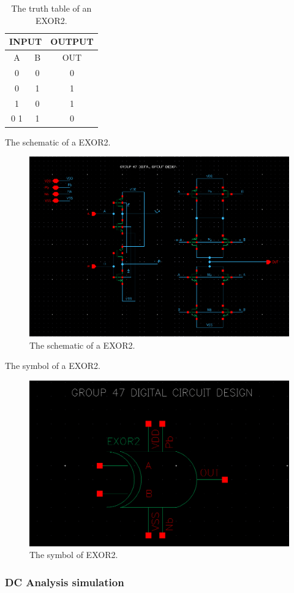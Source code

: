 \begin{table}[H]
	\centering
	\begin{tabular}{|c|c|c|}
		\hline
		\multicolumn{2}{|c|}{INPUT} & OUTPUT \\
		\hline
		A & B  & OUT\\
		\hline
		0 & 0 & 0 \\
		\hline
		0 & 1 & 1\\
		\hline
		1 & 0 & 1\\
		\hline0
		1 & 1 & 0\\
		\hline
	\end{tabular}
	\caption{The truth table of an EXOR2.}
	\label{t_the truth table of EXOR2}
\end{table}

The schematic of a EXOR2.

\begin{figure}[H]
	\centering
	\includegraphics[width=.6\linewidth]{section/EX1/EXOR/EX1_EXOR2_schematic.png}
	\caption{The schematic of a EXOR2.}
	\label{f_EX1_EXOR2_schematic}
\end{figure} 

The symbol of a EXOR2.

\begin{figure}[H]
	\centering
	\includegraphics[width=.6\linewidth]{section/EX1/EXOR/EX1_EXOR2_symbol.png}
	\caption{The symbol of EXOR2.}
	\label{f_EX1_EXOR2_symbol}
\end{figure}

\subsubsection{DC Analysis simulation}

